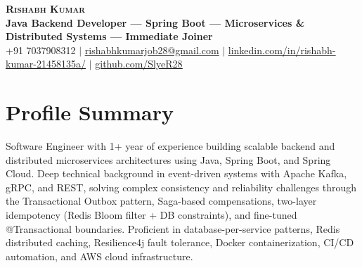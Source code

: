 \documentclass[letterpaper,10pt]{article}
\begin{document}
\begin{center}
    \textbf{\Huge \scshape Rishabh Kumar} \\ \vspace{2pt}
    \small \textbf{Java Backend Developer — Spring Boot — Microservices \& Distributed Systems — Immediate Joiner} \\ \vspace{2pt}
    \small +91 7037908312 $|$ \href{mailto:rishabhkumarjob28@gmail.com}{\underline{rishabhkumarjob28@gmail.com}} $|$ 
    \href{https://linkedin.com/in/rishabh-kumar-21458135a/}{\underline{linkedin.com/in/rishabh-kumar-21458135a/}} $|$
    \href{https://github.com/SlyeR28}{\underline{github.com/SlyeR28}}
\end{center}

\section{Profile Summary}
\small{Software Engineer with 1+ year of experience building scalable backend and distributed microservices architectures using Java, Spring Boot, and Spring Cloud. Deep technical background in event-driven systems with Apache Kafka, gRPC, and REST, solving complex consistency and reliability challenges through the Transactional Outbox pattern, Saga-based compensations, two-layer idempotency (Redis Bloom filter + DB constraints), and fine-tuned @Transactional boundaries. Proficient in database-per-service patterns, Redis distributed caching, Resilience4j fault tolerance, Docker containerization, CI/CD automation, and AWS cloud infrastructure.}

\end{document}
